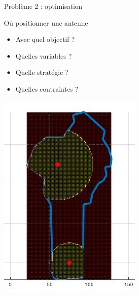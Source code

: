 \documentclass[10pt]{beamer}
\begin{document}
\begin{frame}{Problème 2 : optimisation} 
\begin{minipage}{0.45\textwidth}
\begin{block}{Où positionner une antenne}
\small {\begin{itemize}
\item Avec quel objectif ? 
\item Quelles variables ? 
\item Quelle stratégie ?
\item Quelles contraintes ? 
\end{itemize}}
\end{block}
\end{minipage}
\begin{minipage}{0.53\textwidth}
\begin{center}
\includegraphics[height=1.2\textwidth]{figures/antenne0.jpg}
\end{center}
\end{minipage}
\end{frame}

\end{document}
